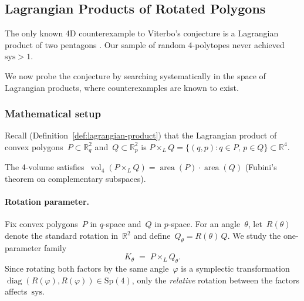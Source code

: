 %
%
%
%

\subsection{Lagrangian Products of Rotated Polygons}
\label{sec:lagrangian-products}

The only known 4D counterexample to Viterbo's conjecture is a Lagrangian
product of two pentagons \cite{HaimKislevOstrover2024}.
Our sample of random 4-polytopes never achieved~$\mathrm{sys} > 1$.

We now probe the conjecture by searching systematically in the space of Lagrangian products, where counterexamples are known to exist.

\subsubsection*{Mathematical setup}

Recall (Definition~\ref{def:lagrangian-product}) that the Lagrangian product
of convex polygons~$P \subset \mathbb{R}^2_q$ and~$Q \subset \mathbb{R}^2_p$
is $P \times_L Q = \{(q,p) : q \in P,\, p \in Q\} \subset \mathbb{R}^4$.

The 4-volume satisfies~$\operatorname{vol}_4(P \times_L Q)
= \operatorname{area}(P) \cdot \operatorname{area}(Q)$ (Fubini's theorem on
complementary subspaces).

\paragraph{Rotation parameter.}
Fix convex polygons~$P$ in $q$-space and~$Q$ in $p$-space.
For an angle~$\theta$, let~$R(\theta)$ denote
the standard rotation in~$\mathbb{R}^2$ and
define~$Q_\theta = R(\theta)\,Q$. We study the one-parameter family
\[
  K_\theta \;=\; P \times_L Q_\theta.
\]
Since rotating both factors by the same angle~$\varphi$ is a symplectic
transformation~$\operatorname{diag}(R(\varphi), R(\varphi)) \in \mathrm{Sp}(4)$,
only the \emph{relative} rotation between the factors affects~$\mathrm{sys}$.

